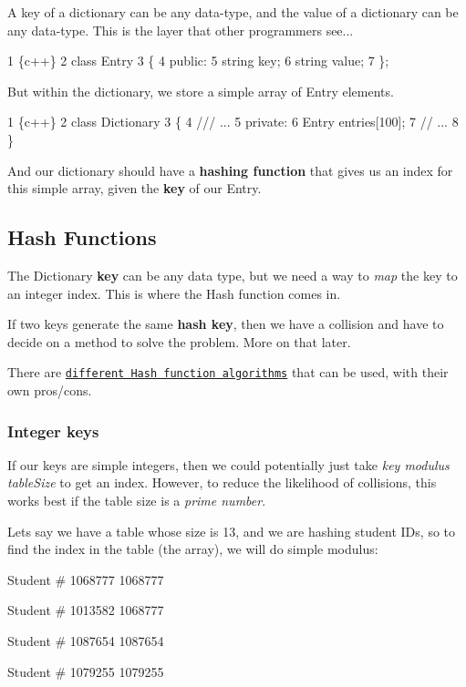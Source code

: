 A key of a dictionary can be any data-\/type, and the value of a dictionary can be any data-\/type. This is the layer that other programmers see...


\begin{DoxyCode}
1 \{c++\}
2 class Entry
3 \{
4     public:
5     string key;
6     string value;
7 \};
\end{DoxyCode}


But within the dictionary, we store a simple array of Entry elements.


\begin{DoxyCode}
1 \{c++\}
2 class Dictionary
3 \{
4     /// ...
5     private:
6     Entry entries[100];
7     // ...
8 \}
\end{DoxyCode}
 And our dictionary should have a {\bfseries hashing function} that gives us an index for this simple array, given the {\bfseries key} of our Entry.

\subsection*{Hash Functions}

The Dictionary {\bfseries key} can be any data type, but we need a way to {\itshape map} the key to an integer index. This is where the Hash function comes in.

If two keys generate the same {\bfseries hash key}, then we have a collision and have to decide on a method to solve the problem. More on that later.

There are \href{https://en.wikipedia.org/wiki/Hash_function#Hash_function_algorithms}{\tt different Hash function algorithms} that can be used, with their own pros/cons.

\subsubsection*{Integer keys}

If our keys are simple integers, then we could potentially just take {\itshape key modulus table\+Size} to get an index. However, to reduce the likelihood of collisions, this works best if the table size is a {\itshape prime number}.

Let\textquotesingle{}s say we have a table whose size is 13, and we are hashing student I\+Ds, so to find the index in the table (the array), we will do simple modulus\+: \begin{DoxyVerb}Student # 1068777
    1068777 %

Student # 1013582
    1068777 %

Student # 1087654
    1087654 %

Student # 1079255
    1079255 %
\end{DoxyVerb}


